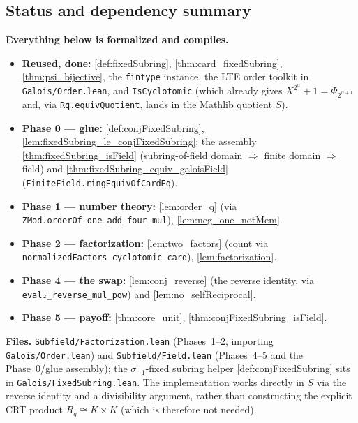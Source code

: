 \subsection{Status and dependency summary}

\textbf{Everything below is formalized and compiles.}

\begin{itemize}
  \item \textbf{Reused, done:} \ref{def:fixedSubring}, \ref{thm:card_fixedSubring},
        \ref{thm:psi_bijective}, the \texttt{fintype} instance, the LTE order toolkit in
        \texttt{Galois/Order.lean}, and \texttt{IsCyclotomic} (which already gives
        $X^{2^\alpha}+1 = \Phi_{2^{\alpha+1}}$ and, via \texttt{Rq.equivQuotient}, lands in the
        Mathlib quotient $S$).
  \item \textbf{Phase 0 --- glue:} \ref{def:conjFixedSubring},
        \ref{lem:fixedSubring_le_conjFixedSubring}; the assembly \ref{thm:fixedSubring_isField}
        (subring-of-field domain $\Rightarrow$ finite domain $\Rightarrow$ field) and
        \ref{thm:fixedSubring_equiv_galoisField} (\texttt{FiniteField.ringEquivOfCardEq}).
  \item \textbf{Phase 1 --- number theory:} \ref{lem:order_q} (via
        \texttt{ZMod.orderOf\_one\_add\_four\_mul}), \ref{lem:neg_one_notMem}.
  \item \textbf{Phase 2 --- factorization:} \ref{lem:two_factors} (count via
        \texttt{normalizedFactors\_cyclotomic\_card}), \ref{lem:factorization}.
  \item \textbf{Phase 4 --- the swap:} \ref{lem:conj_reverse} (the reverse identity, via
        \texttt{eval₂\_reverse\_mul\_pow}) and \ref{lem:no_selfReciprocal}.
  \item \textbf{Phase 5 --- payoff:} \ref{thm:core_unit}, \ref{thm:conjFixedSubring_isField}.
\end{itemize}

\noindent
\textbf{Files.} \texttt{Subfield/Factorization.lean} (Phases~1--2, importing
\texttt{Galois/Order.lean}) and \texttt{Subfield/Field.lean} (Phases~4--5 and the Phase~0/glue
assembly); the $\sigma_{-1}$-fixed subring helper \ref{def:conjFixedSubring} sits in
\texttt{Galois/FixedSubring.lean}. The implementation works directly in $S$ via the reverse
identity and a divisibility argument, rather than constructing the explicit CRT product
$R_q \cong K\times K$ (which is therefore not needed).


